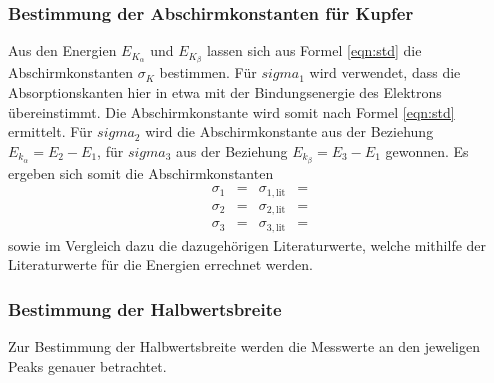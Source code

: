 \subsubsection{Bestimmung der Abschirmkonstanten für Kupfer}
Aus den Energien $E_{K_\alpha}$ und $E_{K_\beta}$ lassen sich aus Formel \eqref{eqn:std} die Abschirmkonstanten $\sigma_K$ bestimmen.
Für $sigma_1$ wird verwendet, dass die Absorptionskanten hier in etwa mit der Bindungsenergie des Elektrons übereinstimmt.
Die Abschirmkonstante wird somit nach Formel \eqref{eqn:std} ermittelt.
Für $sigma_2$ wird die Abschirmkonstante aus der Beziehung $E_{k_\alpha} = E_2 - E_1$, für $sigma_3$ aus der Beziehung  $E_{k_\beta} = E_3 - E_1$ gewonnen.
Es ergeben sich somit die Abschirmkonstanten
\begin{align*}
  \sigma_{1} &=  & \sigma_{1, \text{lit}} &=  \\
  \sigma_{2} &=  & \sigma_{2, \text{lit}} &=  \\
  \sigma_{3} &=  & \sigma_{3, \text{lit}} &= 
\end{align*}
sowie im Vergleich dazu die dazugehörigen Literaturwerte, welche mithilfe der Literaturwerte \cite{energie} für die Energien errechnet werden.

\subsubsection{Bestimmung der Halbwertsbreite}
Zur Bestimmung der Halbwertsbreite werden die Messwerte an den jeweligen Peaks genauer betrachtet.

